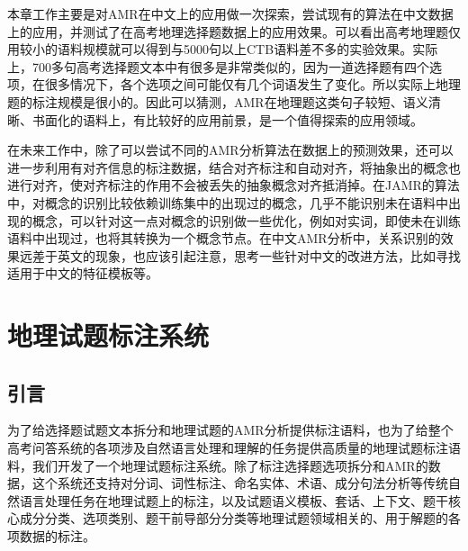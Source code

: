 \documentclass[master, winfont]{njuthesis}
\begin{document}
本章工作主要是对AMR在中文上的应用做一次探索，尝试现有的算法在中文数据上的应用，并测试了在高考地理选择题数据上的应用效果。可以看出高考地理题仅用较小的语料规模就可以得到与5000句以上CTB语料差不多的实验效果。实际上，700多句高考选择题文本中有很多是非常类似的，因为一道选择题有四个选项，在很多情况下，各个选项之间可能仅有几个词语发生了变化。所以实际上地理题的标注规模是很小的。因此可以猜测，AMR在地理题这类句子较短、语义清晰、书面化的语料上，有比较好的应用前景，是一个值得探索的应用领域。

在未来工作中，除了可以尝试不同的AMR分析算法在数据上的预测效果，还可以进一步利用有对齐信息的标注数据，结合对齐标注和自动对齐，将抽象出的概念也进行对齐，使对齐标注的作用不会被丢失的抽象概念对齐抵消掉。在JAMR的算法中，对概念的识别比较依赖训练集中的出现过的概念，几乎不能识别未在语料中出现的概念，可以针对这一点对概念的识别做一些优化，例如对实词，即使未在训练语料中出现过，也将其转换为一个概念节点。在中文AMR分析中，关系识别的效果远差于英文的现象，也应该引起注意，思考一些针对中文的改进方法，比如寻找适用于中文的特征模板等。

\chapter{地理试题标注系统}
\label{chapter:tagger}
\section{引言}
为了给选择题试题文本拆分和地理试题的AMR分析提供标注语料，也为了给整个高考问答系统的各项涉及自然语言处理和理解的任务提供高质量的地理试题标注语料，我们开发了一个地理试题标注系统。除了标注选择题选项拆分和AMR的数据，这个系统还支持对分词、词性标注、命名实体、术语、成分句法分析等传统自然语言处理任务在地理试题上的标注，以及试题语义模板、套话、上下文、题干核心成分分类、选项类别、题干前导部分分类等地理试题领域相关的、用于解题的各项数据的标注。
\end{document}
